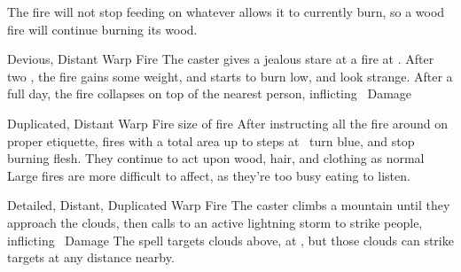 \begin{multicols}{2}
{    The fire will not stop feeding on whatever allows it to currently burn, so a wood fire will continue burning its wood.}



  {Devious, Distant}%
  {Warp}%
  {Fire}%
  {}%
  {The caster gives a jealous stare at a fire at \spellRange.
  After two , the fire gains some weight, and starts to burn low, and look strange.
  After a full day, the fire collapses on top of the nearest person, inflicting \showDam~Damage}%
  {}

  {Duplicated, Distant}%
  {Warp}%
  {Fire}%
  {size of fire}%
  {After instructing all the fire around on proper etiquette, fires with a total area up to  \glspl{step} at \spellRange\ turn blue, and stop burning flesh.
  They continue to act upon wood, hair, and clothing as normal}%
  {Large fires are more difficult to affect, as they're too busy eating to listen.}

  {Detailed, Distant, Duplicated}%
  {Warp}%
  {Fire}%
  {}%
  {The caster climbs a mountain until they approach the clouds, then calls to an active lightning storm to strike  people, inflicting \showDam\ Damage}%
  {The spell targets clouds above, at \spellRange, but those clouds can strike targets at any distance nearby.}


% 
\iftoggle{intro}{}{
  \subsection{Earth}
  \label{earthSpells}

  \showSpells{Earth1}

  \showSpells{Earth1}

  \showSpells{Earth2}

  \showSpells{Earth2}

  \spell{Mud Clamp}%
    {Duplicated, Detailed}%
    {Wax}%
    {Earth}%
    {\roll{Strength}{Survival}}%
    {The caster shouts `\textit{hold fast}', as snow or mud becomes solid, encasing any feet pushed into the ground.
    Targets then count as \textit{Entangled}}%
    {
    The spell suffers a -2~Penalty when used against creatures without flat feet (such as hooves, or most other animal feet), but can also gain up to a +2~Bonus in particularly deep mud or snow.}

}
\end{multicols}

